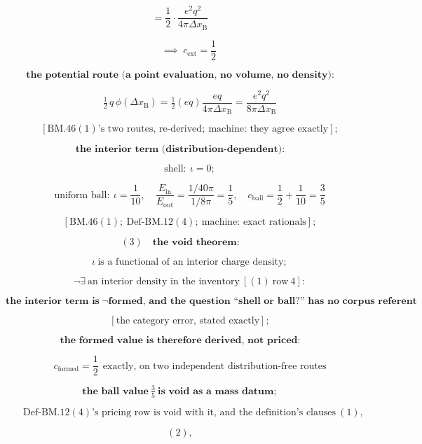 \documentclass[11pt,openany]{report}
\theoremstyle{canonplain}
\theoremstyle{canondef}
\begin{document}
\[
= \frac12\cdot\frac{e^2q^2}{4\pi\Delta x_{\mathrm B}}
\]

\[
\qquad \implies\boxed{\ c_{\mathrm{ext}}=\frac12\ }
\]

\[
\textbf{the potential route (a point evaluation, no volume, no density):}
\]

\[
\qquad \tfrac12\,q\,\phi(\Delta x_{\mathrm B})=\tfrac12(eq)\frac{eq}{4\pi\Delta x_{\mathrm B}}=\frac{e^2q^2}{8\pi\Delta x_{\mathrm B}}
\]

\[
\qquad [\mathrm{BM.46}(1)\text{'s two routes, re-derived};\ \text{machine: they agree exactly}];
\]

\[
\textbf{the interior term (distribution-dependent):}
\]

\[
\qquad \text{shell}:\ \iota=0;
\]

\[
\qquad \text{uniform ball}:\ \iota=\frac1{10},\quad\frac{E_{\mathrm{in}}}{E_{\mathrm{out}}}=\frac{1/40\pi}{1/8\pi}=\frac15,\quad c_{\mathrm{ball}}=\frac12+\frac1{10}=\frac35
\]

\[
\qquad [\mathrm{BM.46}(1);\ \mathrm{Def\text{-}BM.12}(4);\ \text{machine: exact rationals}];
\]

\[
(3)\quad\textbf{the void theorem:}
\]

\[
\qquad \iota\ \text{is a functional of an interior charge density};
\]

\[
\qquad \neg\exists\ \text{an interior density in the inventory}\ [(1)\ \text{row}\ 4]:
\]

\[
\boxed{\ \textbf{the interior term is}\ \neg\textbf{formed, and the question ``shell or ball?'' has no corpus referent}\ }
\]

\[
\qquad [\text{the category error, stated exactly}];
\]

\[
\textbf{the formed value is therefore derived, not priced:}
\]

\[
\qquad \boxed{\ c_{\mathrm{formed}}=\frac12\ \ \text{exactly, on two independent distribution-free routes}\ }
\]

\[
\textbf{the ball value}\ \tfrac35\ \textbf{is void as a mass datum};
\]

\[
\qquad \mathrm{Def\text{-}BM.12}(4)\text{'s pricing row is void with it, and the definition's clauses}\ (1),
\]

\[
(2),
\]
\end{document}
